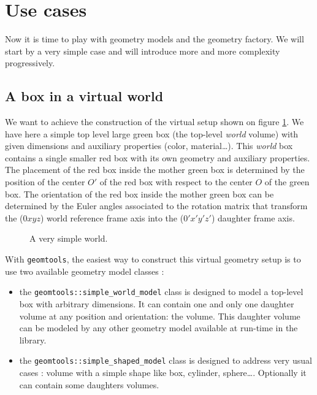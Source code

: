 
\section{Use cases}

Now it is time to play  with geometry models and the geometry factory.
We will start  by a very simple case and will  introduce more and more
complexity progressively.

\subsection{A box in a virtual world}

We want  to achieve  the construction  of the  virtual setup  shown on
figure \ref{fig:mf:0}.   We have here  a simple top level  large green
box  (the top-level  \emph{world}  volume) with  given dimensions  and
auxiliary  properties (color,  material\dots).  This  \emph{world} box
contains a single smaller red box  with its own geometry and auxiliary
properties. The placement  of the red box inside the  mother green box
is determined by the  position of the center $O'$ of  the red box with
respect to  the center $O$ of  the green box.  The  orientation of the
red box  inside the mother  green box can  be determined by  the Euler
angles associated to  the rotation matrix that  transform the ($0xyz$)
world reference frame axis into the ($0'x'y'z'$) daughter frame axis.


\begin{figure}[h]
\begin{center}
\scalebox{0.75}{}
\end{center}
\caption{A very simple world.}\label{fig:mf:0}
\end{figure}

With  \texttt{geomtools}, the  easiest way  to construct  this virtual
geometry setup is to use two available geometry model classes :
\begin{itemize}

\item  the \texttt{geomtools::simple\_world\_model} class  is designed
  to model a  top-level box with arbitrary dimensions.  It can contain
  one and  only one daughter  volume at any position  and orientation:
  the  volume.   This daughter volume can be  modeled by any
  other geometry model available at run-time in the library.

\item the  \texttt{geomtools::simple\_shaped\_model} class is designed
  to address very  usual cases : volume with a  simple shape like box,
  cylinder,  sphere\dots.  Optionally  it  can contain  some  daughters
  volumes.

\end{itemize}

